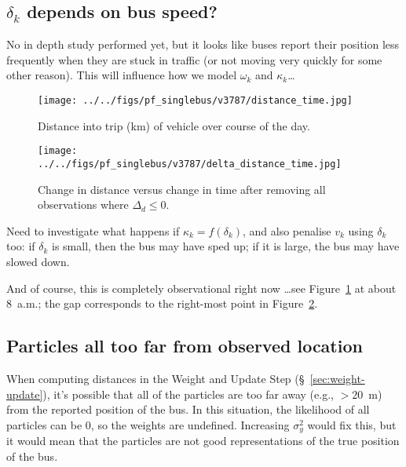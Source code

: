 \documentclass[10pt,a4paper]{article}
\begin{document}
\subsection{$\delta_k$ depends on bus speed?}

No in depth study performed yet, but it looks like buses report their position less 
frequently when they are stuck in traffic (or not moving very quickly for some other
reason).
This will influence how we model $\omega_k$ and $\kappa_k$\ldots




\begin{figure}[hb!]
  \centering
  \texttt{[image: ../../figs/pf\_singlebus/v3787/distance\_time.jpg]}
  \caption{Distance into trip (km) of vehicle over course of the day.}
  \label{fig:distance-time}
\end{figure}

\begin{figure}[tbp]
  \centering
  \texttt{[image: ../../figs/pf\_singlebus/v3787/delta\_distance\_time.jpg]}
  \caption{Change in distance versus change in time after removing all observations where $\Delta_d \leq 0$.}
  \label{fig:delta-distance-time}
\end{figure}


Need to investigate what happens if $\kappa_k = f(\delta_k)$,
and also penalise $v_k$ using $\delta_k$ too: if $\delta_k$ is small, 
then the bus may have sped up; if it is large, the bus may have slowed down.

And of course, this is completely observational right now \ldots see Figure~\ref{fig:distance-time}
at about 8~a.m.; the gap corresponds to the right-most point in Figure~\ref{fig:delta-distance-time}.





\subsection{Particles all too far from observed location}

When computing distances in the Weight and Update Step (\S~\ref{sec:weight-update}),
it's possible that all of the particles are too far away (e.g., $>20$~m) from the 
reported position of the bus. In this situation, the likelihood of all particles
can be 0, so the weights are undefined. 
Increasing $\sigma_y^2$ would fix this, but it would mean that the particles are not 
good representations of the true position of the bus.
\end{document}
